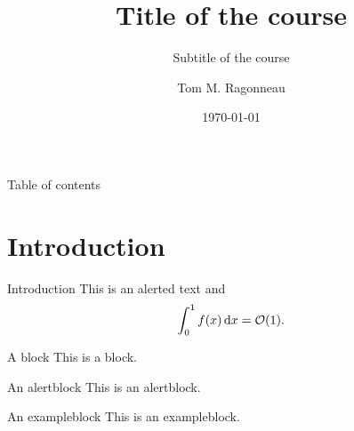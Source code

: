 \documentclass{ragonneau-beamer}
\title{Title of the course}
\subtitle{Subtitle of the course}
\date{\today}
\author{Tom M. Ragonneau}
\institute{
    Department of Applied Mathematics\\ 
    The Hong Kong Polytechnic University
}
\begin{document}
\maketitle

\begin{frame}{Table of contents}
    \tableofcontents[hideallsubsections]
\end{frame}

\section{Introduction}

\begin{frame}{Introduction}
    This is an \alert{alerted text} and
    \begin{equation*}
        \int_0^1 f(x) \, \mathrm{d} x = \operatorname{\mathcal{O}}(1).
    \end{equation*}

    \begin{block}{A block}
        This is a block.
    \end{block}

    \begin{alertblock}{An alertblock}
        This is an alertblock.
    \end{alertblock}

    \begin{exampleblock}{An exampleblock}
        This is an exampleblock.
    \end{exampleblock}
\end{frame}

\appendix
\end{document}
